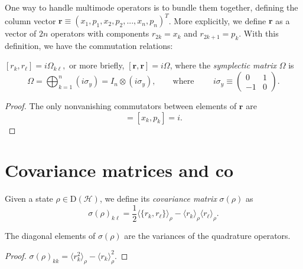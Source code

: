 \documentclass[12pt]{report}
\newcommand{\bs}[1]{\boldsymbol{#1}}
\newcommand{\calH}{{\mathcal{H}}}
\newcommand{\rmD}{{\mathrm{D}}}
\begin{document}
One way to handle multimode operators is to bundle them together, defining the column vector
$\bs r \equiv (x_1, p_1, x_2, p_2, ..., x_n, p_n)^T$.
More explicitly, we define $\bs r$ as a vector of $2n$ operators with components $r_{2k}=x_k$ and $r_{2k+1}=p_k$.
With this definition, we have the commutation relations:
\begin{prop}
	$[r_k, r_\ell] = i\Omega_{k\ell},$
	or more briefly, $[\bs r,\bs r] = i\Omega$,
	where the \emph{symplectic matrix} $\Omega$ is
	\begin{equation}
		\Omega = \bigoplus_{k=1}^{n} (i\sigma_y)
		= I_n \otimes (i\sigma_y),
		\qquad
		\text{where }
		\qquad
		i\sigma_y\equiv \begin{pmatrix}
			0 & 1\\-1& 0
		\end{pmatrix}.
	\end{equation}
\end{prop}
\begin{proof}
	The only nonvanishing commutators between elements of $\bs r$ are
	\begin{equation}
		[r_{2k}, r_{2k+1}] = [x_k, p_k] = i.
	\end{equation}
\end{proof}


\section{Covariance matrices and co}

\begin{defn}
	Given a state $\rho\in\rmD(\calH)$,
	we define its \emph{covariance matrix} $\sigma(\rho)$ as
	\begin{equation}
		\sigma(\rho)_{k\ell}
		= \frac12 \langle \{ r_k, r_\ell\}\rangle_\rho
		- \langle r_k\rangle_\rho \langle r_\ell\rangle_\rho.
	\end{equation}
\end{defn}

\begin{prop}
	The diagonal elements of $\sigma(\rho)$ are the variances of the quadrature operators.
\end{prop}
\begin{proof}
	$\sigma(\rho)_{kk} = \langle r_k^2\rangle_\rho - \langle r_k\rangle_\rho^2.$
\end{proof}
\end{document}
